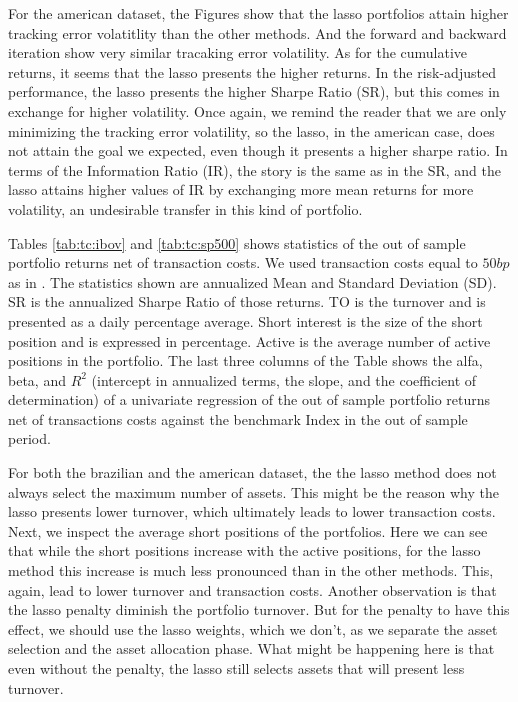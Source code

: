 \documentclass[preprint,authoryear,review,12pt]{elsarticle}
\begin{document}
For the american dataset, the Figures show that the lasso portfolios attain higher tracking error volatitlity than the other methods.
And the forward and backward iteration show very similar tracaking error volatility.
As for the cumulative returns, it seems that the lasso presents the higher returns.
In the risk-adjusted performance, the lasso presents the higher Sharpe Ratio (SR), but this comes in exchange for higher volatility.
Once again, we remind the reader that we are only minimizing the tracking error volatility, so the lasso, in the american case, does not attain the goal we expected, even though it presents a higher sharpe ratio.
In terms of the Information Ratio (IR), the story is the same as in the SR, and the lasso attains higher values of IR by exchanging more mean returns for more volatility, an undesirable transfer in this kind of portfolio.


Tables \ref{tab:tc:ibov} and \ref{tab:tc:sp500} shows statistics of the out of sample portfolio returns net of transaction costs.
We used transaction costs equal to $50bp$ as in \cite{dgu2009}.
The statistics shown are annualized Mean and Standard Deviation (SD).
SR is the annualized Sharpe Ratio of those returns.
TO is the turnover and is presented as a daily percentage average.
Short interest is the size of the short position and is expressed in percentage.
Active is the average number of active positions in the portfolio.
The last three columns of the Table shows the alfa, beta, and $R^2$ (intercept in annualized terms, the slope, and the coefficient of determination) of a univariate regression of the out of sample portfolio returns net of transactions costs against the benchmark Index in the out of sample period.

For both the brazilian and the american dataset, the the lasso method does not always select the maximum number of assets.
This might be the reason why the lasso presents lower turnover, which ultimately leads to lower transaction costs.
Next, we inspect the average short positions of the portfolios.
Here we can see that while the short positions increase with the active positions, for the lasso method this increase is much less pronounced than in the other methods.
This, again, lead to lower turnover and transaction costs.
Another observation is that the lasso penalty diminish the portfolio turnover.
But for the penalty to have this effect, we should use the lasso weights, which we don't, as we separate the asset selection and the asset allocation phase.
What might be happening here is that even without the penalty, the lasso still selects assets that will present less turnover.
\end{document}
